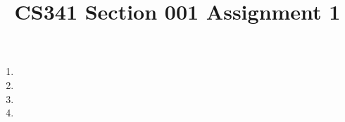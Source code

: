 \documentclass[12pt]{article}
\title{CS341 Section 001 Assignment 1}
\begin{document}
\maketitle

\begin{enumerate}
\item
\item
\item
\item
\end{enumerate}
\end{document}
